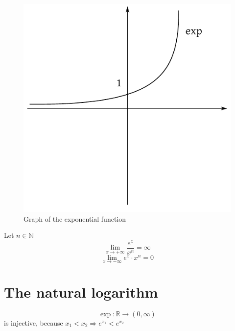 \documentclass[a4paper,landscape,twocolumn]{article}
\theoremstyle{definition}
\begin{document}
\begin{figure}[!h]
  \begin{center}
    \includegraphics{img/exp-graph.pdf}
    \caption{Graph of the exponential function}
  \end{center}
\end{figure}

Let $n \in \mathbb N$
\[ \lim_{x\to+\infty} \frac{e^x}{x^n} = \infty \]
\[ \lim_{x\to-\infty} e^x \cdot x^n = 0 \]

\section{The natural logarithm}
%
\[ \exp: \mathbb R \to (0,\infty) \]
is injective, because $x_1 < x_2 \Rightarrow e^{x_1} < e^{x_2}$
\end{document}
